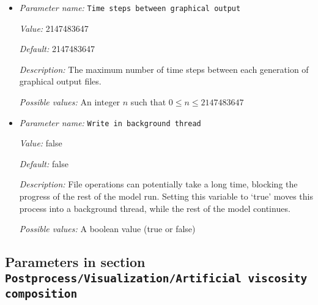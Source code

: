 \begin{itemize}
{\it Value:} 1e8


{\it Default:} 1e8


{\it Description:} The time interval between each generation of graphical output files. A value of zero indicates that output should be generated in each time step. Units: years if the 'Use years in output instead of seconds' parameter is set; seconds otherwise.


{\it Possible values:} A floating point number $v$ such that $0 \leq v \leq \text{MAX\_DOUBLE}$
\item {\it Parameter name:} {\tt Time steps between graphical output}
\label{parameters:Postprocess/Visualization/Time steps between graphical output}
\label{parameters:Postprocess/Visualization/Time_20steps_20between_20graphical_20output}


{\it Value:} 2147483647


{\it Default:} 2147483647


{\it Description:} The maximum number of time steps between each generation of graphical output files.


{\it Possible values:} An integer $n$ such that $0\leq n \leq 2147483647$
\item {\it Parameter name:} {\tt Write in background thread}
\label{parameters:Postprocess/Visualization/Write in background thread}
\label{parameters:Postprocess/Visualization/Write_20in_20background_20thread}


{\it Value:} false


{\it Default:} false


{\it Description:} File operations can potentially take a long time, blocking the progress of the rest of the model run. Setting this variable to `true' moves this process into a background thread, while the rest of the model continues.


{\it Possible values:} A boolean value (true or false)
\end{itemize}



\subsection{Parameters in section \tt Postprocess/Visualization/Artificial viscosity composition}
\label{parameters:Postprocess/Visualization/Artificial_20viscosity_20composition}

